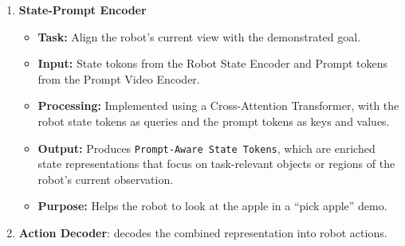 \begin{enumerate}
\begin{itemize}
            \item \textbf{Input:} The robot's observation, which includes the current and last $k$ robot camera frames.
            \item \textbf{Processing:} 
            The Processing pipeline is the same as in the Prompt Video Encoder, where each frame is first passed through a \texttt{Per-Frame Image Encoder} and then aggregated over time using a \texttt{Perceiver State Resampler}. The weights of the \texttt{Per-Frame Image Encoder} are shared between the Prompt Encoder and State Encoder.
            \item \textbf{Output:} 
            Produces \texttt{State Tokens} describing a compact representation of the robot's current visual scene and the objects within it. 
            \item \textbf{Purpose:} 
            Temporal encoding of the robot state, which allows understanding of object motion and robot context,
        \end{itemize}
    \item \textbf{State-Prompt Encoder} 
        \begin{itemize}
            \item \textbf{Task:} 
            Align the robot's current view with the demonstrated goal.
            \item \textbf{Input:} State tokons from the Robot State Encoder and Prompt tokens from the Prompt Video Encoder. 
            \item \textbf{Processing:} 
            Implemented using a Cross-Attention Transformer, with the robot state tokens as queries and the prompt tokens as keys and values. 
            \item \textbf{Output:} 
            Produces \texttt{Prompt-Aware State Tokens}, which are enriched state representations that focus on task-relevant objects or regions of the robot's current observation.
            \item \textbf{Purpose:} 
            Helps the robot to look at the apple in a ``pick apple'' demo.
        \end{itemize}
    \item \textbf{Action Decoder}: decodes the combined representation into robot actions.

\end{enumerate}
